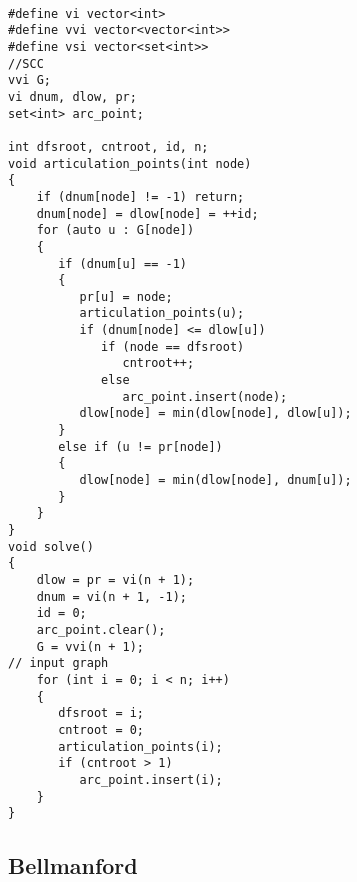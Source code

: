 \begin{lstlisting}[style=cpp]
  
#define vi vector<int>  
#define vvi vector<vector<int>>  
#define vsi vector<set<int>>  
//SCC  
vvi G;  
vi dnum, dlow, pr;  
set<int> arc_point;  
  
int dfsroot, cntroot, id, n;  
void articulation_points(int node)  
{  
    if (dnum[node] != -1) return;  
    dnum[node] = dlow[node] = ++id;  
    for (auto u : G[node])  
    {  
       if (dnum[u] == -1)  
       {  
          pr[u] = node;  
          articulation_points(u);  
          if (dnum[node] <= dlow[u])  
             if (node == dfsroot)  
                cntroot++;  
             else  
                arc_point.insert(node);  
          dlow[node] = min(dlow[node], dlow[u]);  
       }  
       else if (u != pr[node])  
       {  
          dlow[node] = min(dlow[node], dnum[u]);  
       }  
    }  
}  
void solve()  
{  
    dlow = pr = vi(n + 1);  
    dnum = vi(n + 1, -1);  
    id = 0;  
    arc_point.clear();  
    G = vvi(n + 1);  
// input graph  
    for (int i = 0; i < n; i++)  
    {  
       dfsroot = i;  
       cntroot = 0;  
       articulation_points(i);  
       if (cntroot > 1)  
          arc_point.insert(i);  
    }  
}
\end{lstlisting}

\subsection{Bellmanford}

